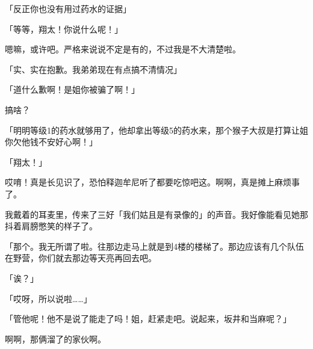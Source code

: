 「反正你也没有用过药水的证据」

「等等，翔太！你说什么呢！」

嗯嘛，或许吧。严格来说说不定是有的，不过我是不大清楚啦。

「实、实在抱歉。我弟弟现在有点搞不清情况」

「道什么歉啊！是姐你被骗了啊！」

搞啥？

「明明等级1的药水就够用了，他却拿出等级5的药水来，那个猴子大叔是打算让姐你欠他钱不安好心啊！」

「翔太！」

哎唷！真是长见识了，恐怕释迦牟尼听了都要吃惊吧这。啊啊，真是摊上麻烦事了。

我戴着的耳麦里，传来了三好「我们姑且是有录像的」的声音。我好像能看见她那抖着肩膀憋笑的样子了。

「那个。我无所谓了啦。往那边走马上就是到4楼的楼梯了。那边应该有几个队伍在野营，你们就去那边等天亮再回去吧。

「诶？」

「哎呀，所以说啦……」

「管他呢！他不是说了能走了吗！姐，赶紧走吧。说起来，坂井和当麻呢？」

啊啊，那俩溜了的家伙啊。

